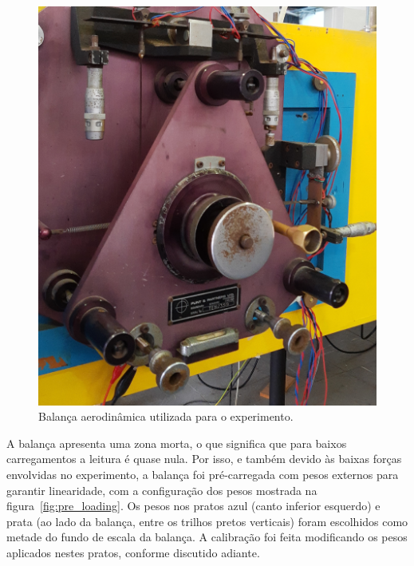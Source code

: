\begin{figure}[htbp]
    \centering
    \includegraphics[width=\textwidth]{img/eixocropped.jpg}
    \caption{Balança aerodinâmica utilizada para o experimento.}\label{fig:3axis_scale}
\end{figure}

A balança apresenta uma zona morta, o que significa que para baixos carregamentos a leitura é quase nula. Por isso, e também devido às baixas forças envolvidas no experimento, a balança foi pré-carregada com pesos externos para garantir linearidade, com a configuração dos pesos mostrada na figura~\ref{fig:pre_loading}. Os pesos nos pratos azul (canto inferior esquerdo) e prata (ao lado da balança, entre os trilhos pretos verticais) foram escolhidos como metade do fundo de escala da balança. A calibração foi feita modificando os pesos aplicados nestes pratos, conforme discutido adiante.

